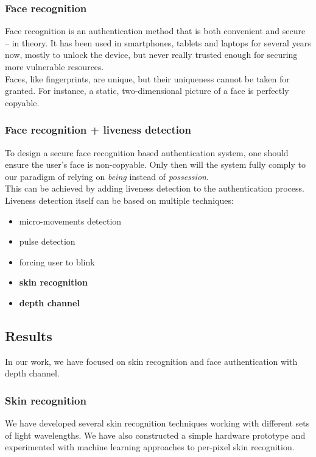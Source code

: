         \subsubsection*{Face recognition}
            Face recognition is an authentication method that is both convenient
            and secure -- in theory. It has been used in smartphones, tablets
            and laptops for several years now, mostly to unlock the device, but
            never really trusted enough for securing more vulnerable resources.\\
            Faces, like fingerprints, are unique, but their uniqueness cannot be
            taken for granted. For instance, a static, two-dimensional picture of
            a face is perfectly copyable.

        \subsubsection*{Face recognition + liveness detection}
            To design a secure face recognition based authentication system,
            one should ensure the user's face is non-copyable. Only then will the
            system fully comply to our paradigm of relying on \textit{being} instead
            of \textit{possession}.\\
            This can be achieved by adding liveness detection to the authentication
            process. Liveness detection itself can be based on multiple techniques:
            \begin{itemize}
                \item micro-movements detection
                \item pulse detection
                \item forcing user to blink
                \item \textbf{skin recognition}
                \item \textbf{depth channel}
            \end{itemize}

    \subsection{Results}
        In our work, we have focused on skin recognition and face authentication
        with depth channel.
        \subsubsection*{Skin recognition}
        We have developed several skin recognition techniques working with different
        sets of light wavelengths. We have also constructed a simple hardware prototype
        and experimented with machine learning approaches to per-pixel skin recognition.

